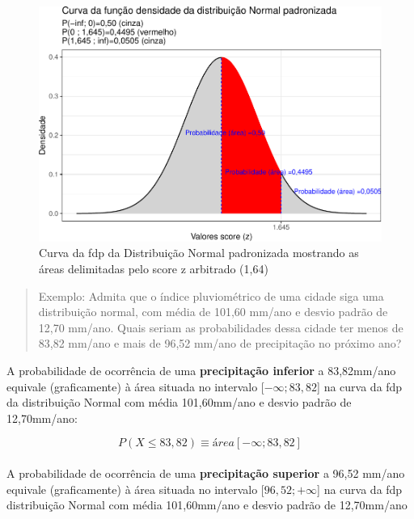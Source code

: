 \documentclass[
]{book}
\begin{document}
\begin{figure}[H]

{\centering \includegraphics{apostila_files/figure-latex/unnamed-chunk-86-1} 

}

\caption{Curva da fdp da Distribuição Normal padronizada mostrando as áreas delimitadas pelo score z arbitrado (1,64)}\label{fig:unnamed-chunk-86}
\end{figure}

\hfill\break

\begin{quote}
Exemplo: Admita que o índice pluviométrico de uma cidade siga uma distribuição normal, com média de 101,60 mm/ano e desvio padrão de 12,70 mm/ano. Quais seriam as probabilidades dessa cidade ter menos de 83,82 mm/ano e mais de 96,52 mm/ano de precipitação no próximo ano?
\end{quote}

\hfill\break

A probabilidade de ocorrência de uma \textbf{precipitação inferior} a 83,82mm/ano equivale (graficamente) à área situada no intervalo {[}\(-\infty ; 83,82\){]} na curva da fdp da distribuição Normal com média 101,60mm/ano e desvio padrão de 12,70mm/ano:

\hfill\break

\[
P(X \le 83,82) \equiv área[-\infty ; 83,82]
\]\\

A probabilidade de ocorrência de uma \textbf{precipitação superior} a 96,52 mm/ano equivale (graficamente) à área situada no intervalo {[}\(96,52 ; +\infty\){]} na curva da fdp distribuição Normal com média 101,60mm/ano e desvio padrão de 12,70mm/ano
\end{document}

